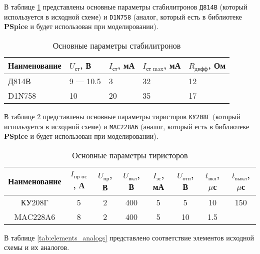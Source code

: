 В таблице \ref{tab:stabilitrons} представлены основные параметры стабилитронов \verb+Д814В+ (который используется в исходной схеме) и \verb+D1N758+ (аналог, который есть в библиотеке \textbf{PSpice} и будет использован при моделировании).

\begin{table}[H]
\begin{center}
	\caption{Основные параметры стабилитронов}
	\label{tab:stabilitrons}
	\def\tabcolsep{10pt}
	\begin{tabular}{|l|l|l|l|l|}
		\hline
		Наименование &
		$U_\text{ст}$, В &
		$I_\text{ст}$, мА &
		$I_\text{ст max}$, мА &
		$R_\text{дифф}$, Ом \\ 
		\hline
		Д814В &
		9 --- 10.5 &
		3 &
		32 &
		12 \\
		\hline
		D1N758 &
		10 &
		20 &
		35 &
		17 \\
		\hline
\end{tabular}
\end{center}
\end{table}

В таблице \ref{tab:thyristors} представлены основные параметры тиристоров \verb+КУ208Г+ (который используется в исходной схеме) и \verb+MAC228A6+ (аналог, который есть в библиотеке \textbf{PSpice} и будет использован при моделировании).

\begin{table}[H]
\begin{center}
	\caption{Основные параметры тиристоров}
	\label{tab:thyristors}
	\def\tabcolsep{4pt}
	\begin{tabular}{|c|c|c|c|c|c|c|c|}
		\hline
		Наименование &
		$I_\text{пр ос}$, А &
		$U_\text{пр}$, В &
		$U_\text{вкл}$, В &
		$I_\text{зс}$, мА &
		$U_\text{отп}$, В &
		$t_\text{вкл}$, $\mu$с &
		$t_\text{выкл}$, $\mu$с \\ 
		\hline
		КУ208Г &
		5 &
		2 &
		400 &
		5 &
		5 &
		10 &
		150 \\
		\hline
		MAC228A6 &
		8 &
		2 &
		400 &
		5 &
		10 &
		1.5 &
		\\
		\hline
\end{tabular}
\end{center}
\end{table}

В таблице \ref{tab:elements_analogs} представлено соответствие элементов исходной схемы и их аналогов.

